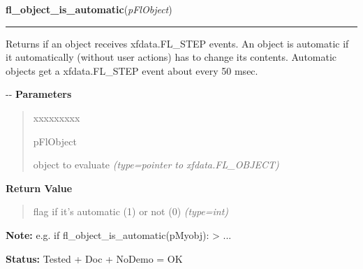 \hspace{.8\funcindent}\begin{boxedminipage}{\funcwidth}

    \raggedright \textbf{fl\_object\_is\_automatic}(\textit{pFlObject})

    \vspace{-1.5ex}

    \rule{\textwidth}{0.5\fboxrule}
\setlength{\parskip}{2ex}

Returns if an object receives xfdata.FL\_STEP events. An object is
automatic if it automatically (without user actions) has to change its
contents. Automatic objects get a xfdata.FL\_STEP event about every 50 msec.

-{}-
\setlength{\parskip}{1ex}
      \textbf{Parameters}
      \vspace{-1ex}

      \begin{quote}
        \begin{Ventry}{xxxxxxxxx}

          \item[pFlObject]


object to evaluate
            {\it (type=pointer to xfdata.FL\_OBJECT)}

        \end{Ventry}

      \end{quote}

      \textbf{Return Value}
    \vspace{-1ex}

      \begin{quote}

flag if it's automatic (1) or not (0)
      {\it (type=int)}

      \end{quote}

\textbf{Note:} 
e.g. if fl\_object\_is\_automatic(pMyobj): > ...


\textbf{Status:} 
Tested + Doc + NoDemo = OK


    \end{boxedminipage}

    \label{xformslib:flbasic:fl_draw_object_label}

    \vspace{0.5ex}

